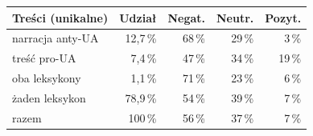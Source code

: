 \begin{tabular}{@{}lrrrr@{}}
\toprule
Treści (unikalne) & Udział & Negat. & Neutr. & Pozyt. \\
\midrule
narracja anty-UA & 12,7\,\% & 68\,\% & 29\,\% & 3\,\% \\
treść pro-UA & 7,4\,\% & 47\,\% & 34\,\% & 19\,\% \\
oba leksykony & 1,1\,\% & 71\,\% & 23\,\% & 6\,\% \\
żaden leksykon & 78,9\,\% & 54\,\% & 39\,\% & 7\,\% \\
\midrule razem & 100\,\% & 56\,\% & 37\,\% & 7\,\% \\
\bottomrule
\end{tabular}
